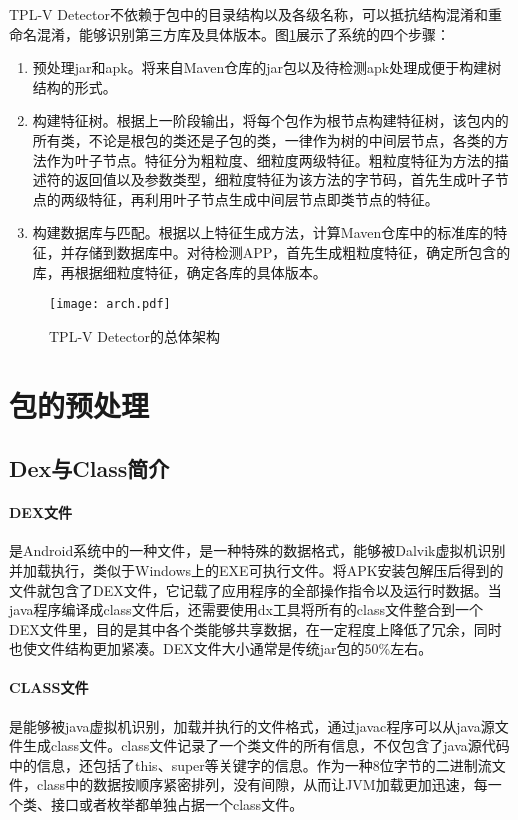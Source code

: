 TPL-V Detector不依赖于包中的目录结构以及各级名称，可以抵抗结构混淆和重命名混淆，能够识别第三方库及具体版本。图\ref{fig:arch}展示了系统的四个步骤：
\begin{enumerate}
\item{预处理jar和apk。将来自Maven仓库的jar包以及待检测apk处理成便于构建树结构的形式。}
\item{构建特征树。根据上一阶段输出，将每个包作为根节点构建特征树，该包内的所有类，不论是根包的类还是子包的类，一律作为树的中间层节点，各类的方法作为叶子节点。特征分为粗粒度、细粒度两级特征。粗粒度特征为方法的描述符的返回值以及参数类型，细粒度特征为该方法的字节码，首先生成叶子节点的两级特征，再利用叶子节点生成中间层节点即类节点的特征。}
\item{构建数据库与匹配。根据以上特征生成方法，计算Maven仓库中的标准库的特征，并存储到数据库中。对待检测APP，首先生成粗粒度特征，确定所包含的库，再根据细粒度特征，确定各库的具体版本。}
\end{enumerate}


\begin{figure}[!htp]
  \centering
  \texttt{[image: arch.pdf]} \\
  \caption{TPL-V Detector的总体架构}
 \label{fig:arch}
\end{figure}


\section{包的预处理}


\subsection{Dex与Class简介}

\paragraph{DEX文件}是Android系统中的一种文件，是一种特殊的数据格式，能够被Dalvik虚拟机识别并加载执行，类似于Windows上的EXE可执行文件。将APK安装包解压后得到的文件就包含了DEX文件，它记载了应用程序的全部操作指令以及运行时数据。当java程序编译成class文件后，还需要使用dx工具将所有的class文件整合到一个DEX文件里，目的是其中各个类能够共享数据，在一定程度上降低了冗余，同时也使文件结构更加紧凑。DEX文件大小通常是传统jar包的50\%左右\cite{10min}。


\paragraph{CLASS文件}是能够被java虚拟机识别，加载并执行的文件格式，通过javac程序可以从java源文件生成class文件。class文件记录了一个类文件的所有信息，不仅包含了java源代码中的信息，还包括了this、super等关键字的信息。作为一种8位字节的二进制流文件，class中的数据按顺序紧密排列，没有间隙，从而让JVM加载更加迅速，每一个类、接口或者枚举都单独占据一个class文件\cite{class}。


